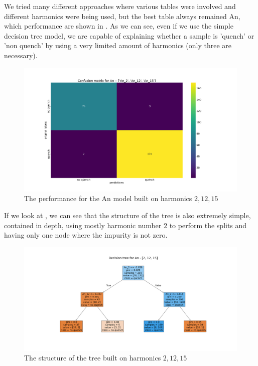 We tried many different approaches where various tables were involved and different harmonics were
being used, but the best table always remained An, which performance are shown in
. As we can see, even if we use the simple decision tree model, we are
capable of explaining whether a sample is 'quench' or 'non quench' by using a very limited amount of
harmonics (only three are necessary).
\begin{figure}[h!]
	\centering
	\includegraphics[width=\linewidth]{img/An_2_12_15_cm_dt.png}
	\caption{The performance for the An model built on harmonics $2, 12, 15$} \label{fig:dt-an-2-12-15-perf}
\end{figure}
If we look at , we can see that the structure of the tree is also
extremely simple, contained in depth, using mostly harmonic number $2$ to perform the splits and
having only one node where the impurity is not zero.
\begin{figure}[h!]
	\centering
	\includegraphics[width=\linewidth]{img/An_2_12_15_pt_dt.png}
	\caption{The structure of the tree built on harmonics $2, 12, 15$} \label{fig:dt-an-2-12-15-pt}
\end{figure}
